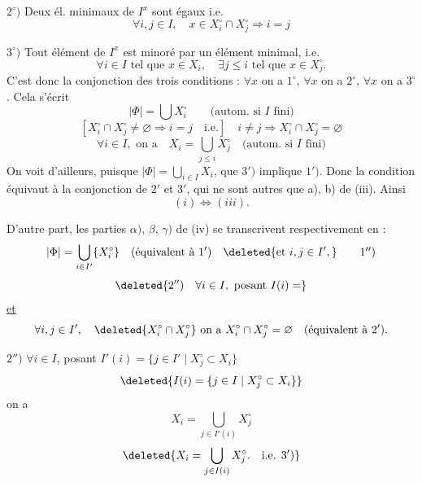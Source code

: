 $2^{\circ})$ Deux él. minimaux de $I^x$ sont égaux i.e.
\[
\forall i,j\in I,\quad x\in X_i^{\circ}\cap X_j^{\circ}\Longrightarrow i=j
\]

$3^{\circ})$ Tout élément de $I^x$ est minoré par un élément minimal,  i.e.
\[
\forall i\in I\text{ tel que }x\in X_i,\quad \exists j\leq i\text{ tel que }x\in X_j^{\circ}.
\]
C'est donc la conjonction des trois conditions : $\forall x$ on a $1^{\circ}$, $\forall x$ on a $2^{\circ}$, $\forall x$ on a $3^{\circ}$. Cela s'écrit
\[
|\Phi|=\bigcup X_i^{\circ}\qquad\text{(autom. si }I\text{ fini)}\tag*{$1'$)}
\]
\[
[X_i^{\circ}\cap X_j^{\circ}\ne\varnothing\Rightarrow i=j\quad\text{i.e.}]\quad i\ne j\Longrightarrow X_i^{\circ}\cap X_j^{\circ}=\varnothing\tag*{$2'$)}
\]
\[
\forall i\in I,\text{ on a}\quad X_i=\bigcup_{j\leq i}X_j^{\circ}\quad\text{(autom. si }I\text{ fini)}\tag*{$3'$)}
\]
On voit d'ailleurs, puisque $|\Phi|=\bigcup_{i\in I}X_i$, que $3')$ implique $1')$. Donc la condition  équivaut à la conjonction de $2'$ et $3'$, qui ne sont autres que a), b) de (iii). Ainsi
\[
(i)\Longleftrightarrow(iii).
\]

D'autre part, les parties $\alpha)$, $\beta$, $\gamma)$ de (iv) se transcrivent respectivement en :
\[
|\Phi|=\bigcup_{i\in I'}\{X_i^{\circ}\}\quad\text{(équivalent à }1'\text{)}\quad\deleted{\text{et }i,j\in I',}\tag*{$1''$)}
\]
\[
\deleted{2'')\quad\forall i\in I,\text{ posant }I(i)=}
\]
\uline{et}
\[
\forall i,j\in I',\quad\deleted{X_i^{\circ}\cap X_j^{\circ}}\text{ on a }X_i^{\circ}\cap X_j^{\circ}=\varnothing\quad\text{(équivalent à }2'\text{)}.
\]

$2'')$ $\forall i\in I$, posant $I'(i)=\{j\in I'\mid X_j^{\circ}\subset X_i\}$\unsure{-,} 
\[
\deleted{I(i)=\{j\in I\mid X_j^{\circ}\subset X_i\}}
\]
on a 
\[
X_i=\bigcup_{j\in I'(i)}X_j^{\circ}
\]
\[
\deleted{X_i=\bigcup_{j\in I(i)}X_j^{\circ}.\quad\text{i.e. }3')}
\]

